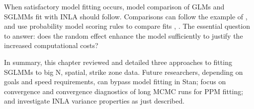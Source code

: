 When satisfactory model fitting occurs, model comparison of GLMs and SGLMMs fit with INLA should follow. Comparisons can follow the example of \cite{Finley2009_2}, and use probability model scoring rules to compare fits \citep{Bickel2007}, \citep{Gneiting2007}. The essential question to answer: does the random effect enhance the model sufficiently to justify the increased computational costs?

In summary, this chapter reviewed and detailed three approaches to fitting SGLMMs to big N, spatial, strike zone data. Future researchers, depending on goals and speed requirements, can bypass model fitting in Stan; focus on convergence and convergence diagnostics of long MCMC runs for PPM fitting; and investigate INLA variance properties as just described. 
